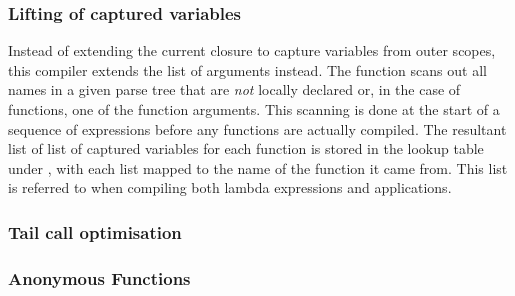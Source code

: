 \subsubsection{Lifting of captured variables}
Instead of extending the current closure to capture variables from outer scopes, this compiler extends the list of arguments instead. The function  scans out all names in a given parse tree that are \textit{not} locally declared or, in the case of functions, one of the function arguments. This scanning is done at the start of a sequence of expressions before any functions are actually compiled. The resultant list of list of captured variables for each function is stored in the lookup table under , with each list mapped to the name of the function it came from. This list is referred to when compiling both lambda expressions and applications. 

\subsubsection{Tail call optimisation}

\subsubsection{Anonymous Functions}